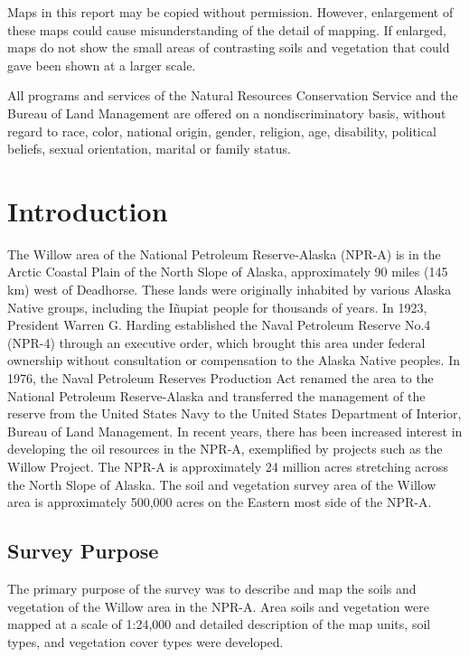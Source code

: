 \documentclass[
]{book}
\theoremstyle{definition}
\theoremstyle{definition}
\theoremstyle{definition}
\theoremstyle{definition}
\theoremstyle{remark}
\begin{document}
Maps in this report may be copied without permission. However, enlargement of these maps could cause misunderstanding of the detail of mapping. If enlarged, maps do not show the small areas of contrasting soils and vegetation that could gave been shown at a larger scale.

All programs and services of the Natural Resources Conservation Service and the Bureau of Land Management are offered on a nondiscriminatory basis, without regard to race, color, national origin, gender, religion, age, disability, political beliefs, sexual orientation, marital or family status.

\hypertarget{introduction}{%
\chapter{Introduction}\label{introduction}}

The Willow area of the National Petroleum Reserve-Alaska (NPR-A) is in the Arctic Coastal Plain of the North Slope of Alaska, approximately 90 miles (145 km) west of Deadhorse. These lands were originally inhabited by various Alaska Native groups, including the Iñupiat people for thousands of years. In 1923, President Warren G. Harding established the Naval Petroleum Reserve No.4 (NPR-4) through an executive order, which brought this area under federal ownership without consultation or compensation to the Alaska Native peoples. In 1976, the Naval Petroleum Reserves Production Act renamed the area to the National Petroleum Reserve-Alaska and transferred the management of the reserve from the United States Navy to the United States Department of Interior, Bureau of Land Management. In recent years, there has been increased interest in developing the oil resources in the NPR-A, exemplified by projects such as the Willow Project. The NPR-A is approximately 24 million acres stretching across the North Slope of Alaska. The soil and vegetation survey area of the Willow area is approximately 500,000 acres on the Eastern most side of the NPR-A.

\hypertarget{survey-purpose}{%
\section{Survey Purpose}\label{survey-purpose}}

The primary purpose of the survey was to describe and map the soils and vegetation of the Willow area in the NPR-A. Area soils and vegetation were mapped at a scale of 1:24,000 and detailed description of the map units, soil types, and vegetation cover types were developed.
\end{document}

